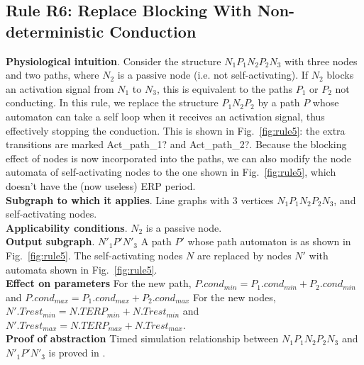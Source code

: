 \subsection{Rule R6: Replace Blocking With Non-deterministic Conduction}
\textbf{Physiological intuition}. 
Consider the structure $N_1 P_1 N_2 P_2 N_3$ with three nodes and two paths, where $N_2$ is a passive node (i.e. not self-activating).
If $N_2$ blocks an activation signal from $N_1$ to $N_3$, this is equivalent to the paths $P_1$ or $P_2$ not conducting.
In this rule, we replace the structure $P_1 N_2 P_2$ by a path $P$ whose automaton can take a self loop when it receives an activation signal, thus effectively stopping the conduction. 
This is shown in Fig.~\ref{fig:rule5}: the extra transitions are marked {\quattrofont Act\_path\_1?} and {\quattrofont Act\_path\_2?}.
Because the blocking effect of nodes is now incorporated into the paths, we can also modify the node automata of self-activating nodes to the one shown in Fig.~\ref{fig:rule5}, which doesn't have the (now useless) ERP period.
\\
\textbf{Subgraph to which it applies}.
Line graphs with 3 vertices $N_1 P_1 N_2 P_2 N_3$, and self-activating nodes.\\
\textbf{Applicability conditions}.
$N_2$ is a passive node.\\
\textbf{Output subgraph}.
$N'_1 P' N'_3$
A path $P'$ whose path automaton is as shown in Fig.~\ref{fig:rule5}.
The self-activating nodes $N$ are replaced by nodes $N'$ with automata shown in Fig.~\ref{fig:rule5}.\\
\textbf{Effect on parameters}
For the new path, $P.cond_{min}=P_1.cond_{min}+P_2.cond_{min}$ and 
$P.cond_{max}=P_1.cond_{max}+P_2.cond_{max}$
For the new nodes, $N'.Trest_{min}=N.TERP_{min}+N.Trest_{min}$ and 
$N'.Trest_{max}=N.TERP_{max}+N.Trest_{max}$.\\
\textbf{Proof of abstraction} Timed simulation relationship between $N_1 P_1 N_2 P_2 N_3$ and $N'_1 P' N'_3$ is proved in \cite{sttt13}.

